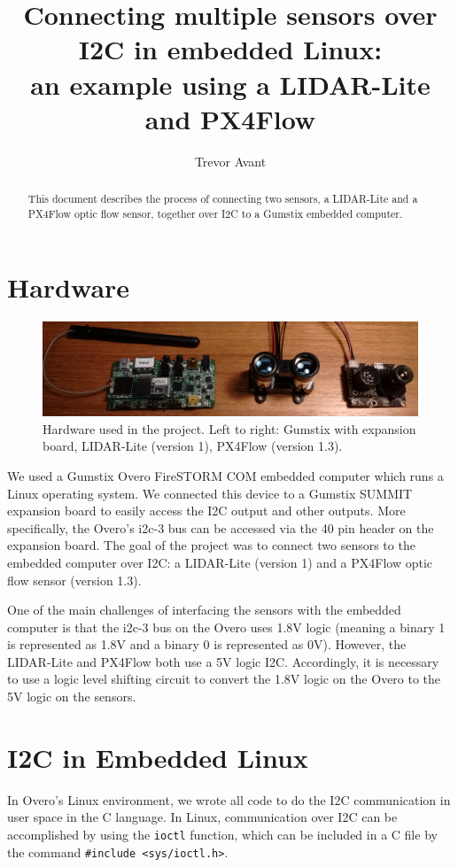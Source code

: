 \documentclass[10pt]{article}
\title{Connecting multiple sensors over I2C in embedded Linux: \\
an example using a LIDAR-Lite and PX4Flow}
\author{Trevor Avant}
\date{}
\begin{document}
\maketitle
\thispagestyle{empty}
\pagestyle{empty}


\begin{abstract}
This document describes the process of connecting two sensors, a LIDAR-Lite and a PX4Flow optic flow sensor, together over I2C to a Gumstix embedded computer.
\end{abstract}

\section*{Hardware}
\begin{figure}[ht]
\centering
\includegraphics[width=1.0\textwidth]{../photos/hardware.pdf}
\caption{Hardware used in the project. Left to right: Gumstix with expansion board, LIDAR-Lite (version 1), PX4Flow (version 1.3).}
\end{figure}
We used a Gumstix Overo FireSTORM COM embedded computer which runs a Linux operating system. We connected this device to a Gumstix SUMMIT expansion board to easily access the I2C output and other outputs. More specifically, the Overo's i2c-3 bus can be accessed via the 40 pin header on the expansion board. The goal of the project was to connect two sensors to the embedded computer over I2C: a LIDAR-Lite (version 1) and a PX4Flow optic flow sensor (version 1.3).

One of the main challenges of interfacing the sensors with the embedded computer is that the i2c-3 bus on the Overo uses 1.8V logic (meaning a binary 1 is represented as 1.8V and a binary 0 is represented as 0V). However, the LIDAR-Lite and PX4Flow both use a 5V logic I2C. Accordingly, it is necessary to use a logic level shifting circuit to convert the 1.8V logic on the Overo to the 5V logic on the sensors.

\section*{I2C in Embedded Linux}
In Overo's Linux environment, we wrote all code to do the I2C communication in user space in the C language. In Linux, communication over I2C can be accomplished by using the \texttt{ioctl} function, which can be included in a C file by the command \texttt{\#include <sys/ioctl.h>}.
\end{document}
